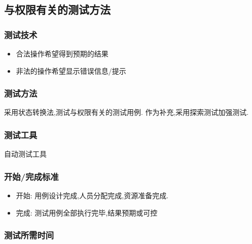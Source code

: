 \documentclass[hyperref, a4paper]{ctexart}
\providecommand{\tightlist}{%
  \setlength{\itemsep}{0pt}\setlength{\parskip}{0pt}}
\begin{document}
\hypertarget{ux4e0eux6743ux9650ux6709ux5173ux7684ux6d4bux8bd5ux65b9ux6cd5}{%
\subsection{与权限有关的测试方法}\label{ux4e0eux6743ux9650ux6709ux5173ux7684ux6d4bux8bd5ux65b9ux6cd5}}

\hypertarget{ux6d4bux8bd5ux6280ux672f-1}{%
\subsubsection{测试技术}\label{ux6d4bux8bd5ux6280ux672f-1}}

\begin{itemize}
\tightlist
\item
  合法操作希望得到预期的结果
\item
  非法的操作希望显示错误信息/提示
\end{itemize}

\hypertarget{ux6d4bux8bd5ux65b9ux6cd5-1}{%
\subsubsection{测试方法}\label{ux6d4bux8bd5ux65b9ux6cd5-1}}

采用状态转换法,测试与权限有关的测试用例. 作为补充,采用探索测试加强测试.

\hypertarget{ux6d4bux8bd5ux5de5ux5177-1}{%
\subsubsection{测试工具}\label{ux6d4bux8bd5ux5de5ux5177-1}}

自动测试工具

\hypertarget{ux5f00ux59cbux5b8cux6210ux6807ux51c6-1}{%
\subsubsection{开始/完成标准}\label{ux5f00ux59cbux5b8cux6210ux6807ux51c6-1}}

\begin{itemize}
\tightlist
\item
  开始: 用例设计完成,人员分配完成,资源准备完成.
\item
  完成: 测试用例全部执行完毕,结果预期或可控
\end{itemize}

\hypertarget{ux6d4bux8bd5ux6240ux9700ux65f6ux95f4-1}{%
\subsubsection{测试所需时间}\label{ux6d4bux8bd5ux6240ux9700ux65f6ux95f4-1}}
\end{document}
